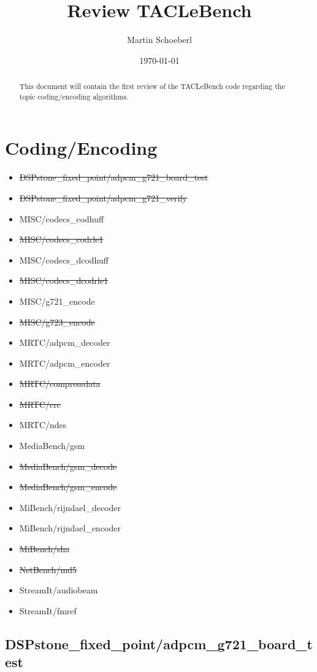 \documentclass[a4paper]{article}
\title{Review TACLeBench}
\author{Martin Schoeberl}
\date{\today}
\begin{document}
\maketitle

\begin{abstract}
This document will contain the first review of the TACLeBench code regarding the
topic coding/encoding algorithms.
\end{abstract}


\section{Coding/Encoding}

\begin{itemize}
        \item \st{DSPstone\_fixed\_point/adpcm\_g721\_board\_test}
        \item \st{DSPstone\_fixed\_point/adpcm\_g721\_verify}
        \item MISC/codecs\_codhuff
        \item \st{MISC/codecs\_codrle1}
        \item MISC/codecs\_dcodhuff
        \item \st{MISC/codecs\_dcodrle1}
        \item MISC/g721\_encode
        \item \st{MISC/g723\_encode}
        \item MRTC/adpcm\_decoder
        \item MRTC/adpcm\_encoder
        \item \st{MRTC/compressdata}
        \item \st{MRTC/crc}
        \item MRTC/ndes
        \item MediaBench/gsm
        \item \st{MediaBench/gsm\_decode}
        \item \st{MediaBench/gsm\_encode}
        \item MiBench/rijndael\_decoder
        \item MiBench/rijndael\_encoder
        \item \st{MiBench/sha}
        \item \st{NetBench/md5}
        \item StreamIt/audiobeam
        \item StreamIt/fmref
\end{itemize}


\subsection{DSPstone\_fixed\_point/adpcm\_g721\_board\_test}
\end{document}
